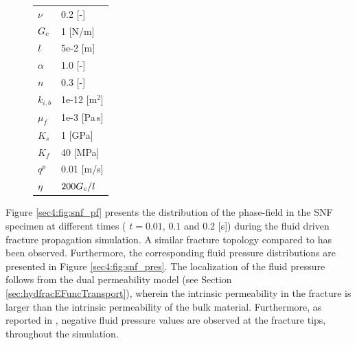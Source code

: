 \documentclass[11pt]{article}
\begin{document}
\begin{figure}[ht]
\begin{minipage}[b]{0.3\linewidth}
\begin{tabular}{ll}
  $\nu$ & 0.2 [-] \\
  $\hbox{$G_c$}$ & 1 [N/m] \\
  $\hbox{$l$}$ & 5e-2 [m] \\
  $\alpha$ & 1.0 [-] \\
  $n$ & 0.3 [-] \\
  $k_{i,b}$ & 1e-12 [m$^2$] \\
  $\mu_f$ & 1e-3 [Pa\,s] \\
  $K_s$ & 1 [GPa] \\ 
  $K_f$ & 40 [MPa]\\
  $q^p$ & 0.01 [m/s] \\
  $\eta$ & $200 \hbox{$G_c$}/\hbox{$l$}$ \\ \hline
  \end{tabular}
\label{sec4:table:hydfracparams}
\end{minipage}
\end{figure}

Figure \ref{sec4:fig:snf_pf} presents the distribution of the phase-field in the SNF specimen at different times ( $t = 0.01$, $0.1$ and $0.2$ [s]) during the fluid driven fracture propagation simulation. A similar fracture topology compared to \cite{Mikelic2015fluidfrac} has been observed. Furthermore, the corresponding fluid pressure distributions are presented in Figure \ref{sec4:fig:snf_pres}. The localization of the fluid pressure follows from the dual permeability model (see Section \ref{sec:hydfracEFuncTransport}), wherein the intrinsic permeability in the fracture is larger than the intrinsic permeability of the bulk material. Furthermore, as reported in \cite{Mikelic2015fluidfrac}, negative fluid pressure values are observed at the fracture tips, throughout the simulation.
\end{document}
